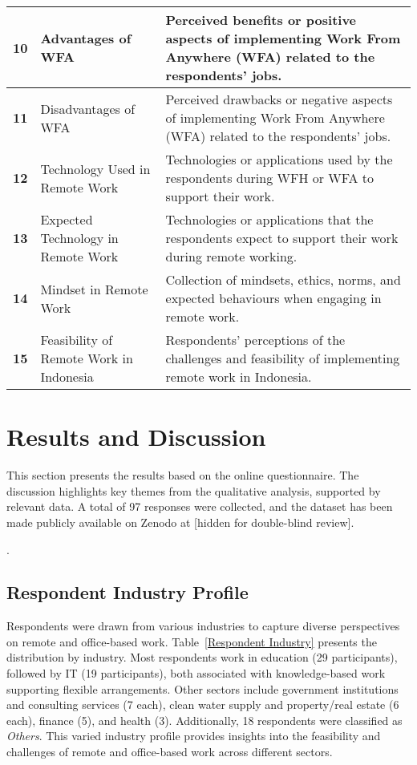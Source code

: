 \documentclass[a4paper, conference]{IEEEtran}
\begin{document}
\begin{table*}[ht]
\begin{tabular}{|p{}|p{}|p{}|}
		\hline
		\textbf{10} & Advantages of WFA & Perceived benefits or positive aspects of implementing Work From Anywhere (WFA) related to the respondents' jobs. \\ 
		\hline
		\textbf{11} & Disadvantages of WFA & Perceived drawbacks or negative aspects of implementing Work From Anywhere (WFA) related to the respondents' jobs. \\ 
		\hline
		\textbf{12} & Technology Used in Remote Work & Technologies or applications used by the respondents during WFH or WFA to support their work. \\ 
		\hline
		\textbf{13} & Expected Technology in Remote Work & Technologies or applications that the respondents expect to support their work during remote working. \\ 
		\hline
		\textbf{14} & Mindset in Remote Work & Collection of mindsets, ethics, norms, and expected behaviours when engaging in remote work. \\ 
		\hline
		\textbf{15} & Feasibility of Remote Work in Indonesia & Respondents' perceptions of the challenges and feasibility of implementing remote work in Indonesia. \\ 
		\hline
	\end{tabular}
\end{table*}




\section{Results and Discussion}
\label{sec:results}

This section presents the results based on the online questionnaire. The discussion highlights key themes from the qualitative analysis, supported by relevant data. A total of 97 responses were collected, and the dataset has been made publicly available on Zenodo at [hidden for double-blind review].

.

\subsection{Respondent Industry Profile}
\label{sec:respondent-industry}

Respondents were drawn from various industries to capture diverse perspectives on remote and office-based work. Table~\ref{Respondent Industry} presents the distribution by industry. Most respondents work in education (29 participants), followed by IT (19 participants), both associated with knowledge-based work supporting flexible arrangements. Other sectors include government institutions and consulting services (7 each), clean water supply and property/real estate (6 each), finance (5), and health (3). Additionally, 18 respondents were classified as \textit{Others}. This varied industry profile provides insights into the feasibility and challenges of remote and office-based work across different sectors.
\end{document}
